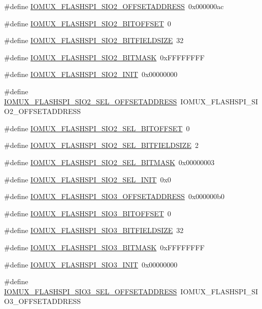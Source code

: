 \begin{DoxyCompactItemize}
\#define \hyperlink{a00560_a856faff42009e82cd28cce6791139cf4}{IOMUX\_\-FLASHSPI\_\-SIO2\_\-OFFSETADDRESS}~0x000000ac
\item 
\#define \hyperlink{a00560_aed462ccf732e0aa3e1f5137af618edf9}{IOMUX\_\-FLASHSPI\_\-SIO2\_\-BITOFFSET}~0
\item 
\#define \hyperlink{a00560_a6a157e3f6ed2c7a04a70520b0a7b8150}{IOMUX\_\-FLASHSPI\_\-SIO2\_\-BITFIELDSIZE}~32
\item 
\#define \hyperlink{a00560_abe6d87405947ee4dbe2730551a2fee33}{IOMUX\_\-FLASHSPI\_\-SIO2\_\-BITMASK}~0xFFFFFFFF
\item 
\#define \hyperlink{a00560_a92f4b73623f55f203dbb792349330304}{IOMUX\_\-FLASHSPI\_\-SIO2\_\-INIT}~0x00000000
\item 
\#define \hyperlink{a00560_ad30ed467d8b5a25a07c23a9ee1d96dd6}{IOMUX\_\-FLASHSPI\_\-SIO2\_\-SEL\_\-OFFSETADDRESS}~IOMUX\_\-FLASHSPI\_\-SIO2\_\-OFFSETADDRESS
\item 
\#define \hyperlink{a00560_af4d88ced1242d0a844b96d03fbe35e7e}{IOMUX\_\-FLASHSPI\_\-SIO2\_\-SEL\_\-BITOFFSET}~0
\item 
\#define \hyperlink{a00560_a5215d5ba9aab7a7eb3904fe3b5ebfd42}{IOMUX\_\-FLASHSPI\_\-SIO2\_\-SEL\_\-BITFIELDSIZE}~2
\item 
\#define \hyperlink{a00560_a97ee3ad3cf2351697c43ef6ea2848237}{IOMUX\_\-FLASHSPI\_\-SIO2\_\-SEL\_\-BITMASK}~0x00000003
\item 
\#define \hyperlink{a00560_af5428fb4ecab954f2b6dcacddf986ac1}{IOMUX\_\-FLASHSPI\_\-SIO2\_\-SEL\_\-INIT}~0x0
\item 
\#define \hyperlink{a00560_a7abce231f8f4c8b3f9e8e5a285d4477f}{IOMUX\_\-FLASHSPI\_\-SIO3\_\-OFFSETADDRESS}~0x000000b0
\item 
\#define \hyperlink{a00560_a7fe4f8cdcffe10320fc5453a06174031}{IOMUX\_\-FLASHSPI\_\-SIO3\_\-BITOFFSET}~0
\item 
\#define \hyperlink{a00560_a2e94d20708e5450945c357587d4d7cba}{IOMUX\_\-FLASHSPI\_\-SIO3\_\-BITFIELDSIZE}~32
\item 
\#define \hyperlink{a00560_a1d5a0afdc4a1b83d8918c2d31051289d}{IOMUX\_\-FLASHSPI\_\-SIO3\_\-BITMASK}~0xFFFFFFFF
\item 
\#define \hyperlink{a00560_a07e40ec52f7c4c377d6042703eebf3d8}{IOMUX\_\-FLASHSPI\_\-SIO3\_\-INIT}~0x00000000
\item 
\#define \hyperlink{a00560_a3b3fccfa7edef58118491dc137ef7627}{IOMUX\_\-FLASHSPI\_\-SIO3\_\-SEL\_\-OFFSETADDRESS}~IOMUX\_\-FLASHSPI\_\-SIO3\_\-OFFSETADDRESS
\item 

\end{DoxyCompactItemize}
